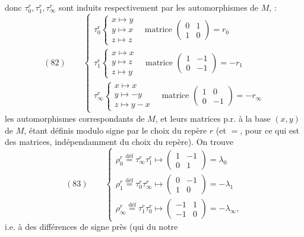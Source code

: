 \documentclass[11pt,a4paper]{article}
\begin{document}
donc $\tau_0^r, \tau_1^r, \tau_\infty^r$ sont induits respectivement par les automorphismes  de $M$, \struck{\ill{}}  :
\[
(82)\qquad
\begin{cases}
\tau_0^r \begin{cases} x \mapsto y \\ y \mapsto x \\ z \mapsto z \end{cases} \quad \text{matrice } \begin{pmatrix} 0 & 1 \\ 1 & 0 \end{pmatrix} = r_0 \\[14pt]
\tau_1^r \begin{cases} x \mapsto x \\ y \mapsto z \\ z \mapsto y \end{cases} \quad \text{matrice } \begin{pmatrix} 1 & -1 \\ 0 & -1 \end{pmatrix} = -r_1 \\[14pt]
\tau_\infty^r \begin{cases} x \mapsto x \\ y \mapsto -y \\ z \mapsto y - x \end{cases} \quad \text{matrice } \begin{pmatrix} 1 & 0 \\ 0 & -1 \end{pmatrix} = -r_\infty
\end{cases}
\]
les automorphismes correspondants de $M$, et leurs matrices p.r. à la base $(x,y)$ de $M$, étant définis modulo signe par le choix du repère $r$ (et $=$, pour ce qui est des matrices, indépendamment du choix du repère). On trouve
\[
(83)\qquad
\begin{cases}
\rho_0^r \overset{\text{déf}}{=} \tau_\infty^r \tau_1^r \longmapsto \begin{pmatrix} 1 & -1 \\ 0 & 1 \end{pmatrix} = \lambda_0 \\[8pt]
\rho_1^r \overset{\text{déf}}{=} \tau_0^r \tau_\infty^r \longmapsto \begin{pmatrix} 0 & -1 \\ 1 & 0 \end{pmatrix} = -\lambda_1 \\[8pt]
\rho_\infty^r \overset{\text{déf}}{=} \tau_1^r \tau_0^r \longmapsto \begin{pmatrix} -1 & 1 \\ -1 & 0 \end{pmatrix} = -\lambda_\infty ,
\end{cases}
\]
i.e. à des différences de signe près (qui du notre
\end{document}
